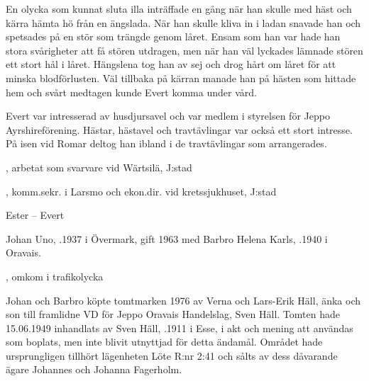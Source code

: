 En olycka som kunnat sluta illa inträffade en gång när han skulle med häst och kärra hämta hö från en ängslada. När han skulle kliva in i ladan snavade han och spetsades på en stör som trängde genom låret. Ensam som han var hade han stora svårigheter att få stören utdragen, men när han väl lyckades lämnade stören ett stort hål i låret. Hängslena tog han av sej och drog hårt om låret för att minska blodförlusten. Väl tillbaka på kärran manade han på hästen som hittade hem och svårt medtagen kunde Evert komma under vård.

Evert var intresserad av husdjursavel och var medlem i styrelsen för Jeppo Ayrshireförening. Hästar, hästavel och travtävlingar var också ett stort intresse. På isen vid Romar deltog han ibland i de travtävlingar som arrangerades.
\begin{jhchildren}
  \item {}
  \item {}, arbetat som svarvare vid Wärtsilä, J:stad
  \item {}
  \item {}, komm.sekr. i Larsmo och ekon.dir. vid kretssjukhuset, J:stad
\end{jhchildren}
Ester   --  Evert 






Johan Uno, .1937 i Övermark, gift 1963 med Barbro Helena Karls, .1940 i Oravais.
\begin{jhchildren}
  \item {}
  \item {}, omkom i trafikolycka
  \item {}
\end{jhchildren}

Johan och Barbro köpte tomtmarken 1976 av Verna och Lars-Erik Häll, änka och son till framlidne VD för Jeppo Oravais Handelslag, Sven Häll. Tomten hade 15.06.1949 inhandlats av Sven Häll, .1911 i Esse, i akt och mening att användas som boplats, men inte blivit utnyttjad för detta ändamål. Området hade ursprungligen tillhört lägenheten Löte R:nr 2:41 och sålts av dess dåvarande ägare Johannes och Johanna Fagerholm.

